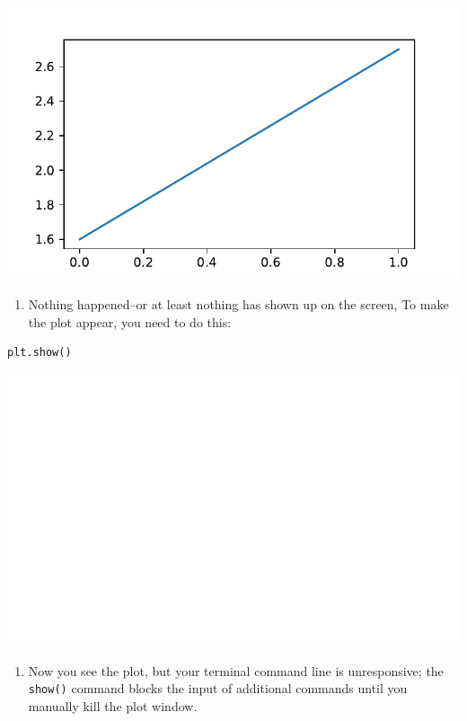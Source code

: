 \documentclass[UTF8,a4paper,12pt]{ctexart}  %
\providecommand{\tightlist}{\setlength{\itemsep}{0pt}\setlength{\parskip}{0pt}}
\newcommand{\passthrough}[1]{\lstset{mathescape=false}#1\lstset{mathescape=true}}
\begin{document}
\begin{center}\includegraphics[width=0.9\linewidth]{python-visualization_files/figure-latex/unnamed-chunk-5-1} \end{center}

\begin{enumerate}
\def\labelenumi{\arabic{enumi}.}
\tightlist
\item
  Nothing happened--or at least nothing has shown up on the screen, To
  make the plot appear, you need to do this:
\end{enumerate}

\begin{lstlisting}[language=Python]
plt.show()
\end{lstlisting}

\begin{center}\includegraphics[width=0.9\linewidth]{python-visualization_files/figure-latex/unnamed-chunk-6-1} \end{center}

\begin{enumerate}
\def\labelenumi{\arabic{enumi}.}
\tightlist
\item
  Now you see the plot, but your terminal command line is
  unresponsive; the \passthrough{\lstinline!show()!} command blocks the input of additional
  commands until you manually kill the plot window.
\end{enumerate}
\end{document}
